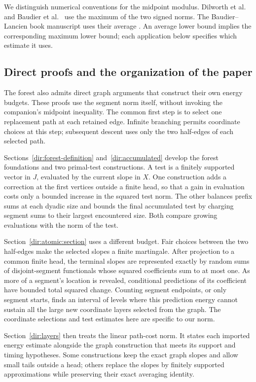 We distinguish numerical conventions for the midpoint modulus.
Dilworth et al.\ \cite[Definition~2.2]{DKRRZ2016} and
Baudier et al.\ \cite[Section~4]{BaudierEtAl2017} use the maximum of the
two signed norms. The Baudier--Lancien book manuscript uses their
average \cite[Definition~5.1.15 of arXiv v1]{BaudierLancien2025}.
An average lower bound implies the corresponding maximum lower bound;
each application below specifies which estimate it uses.

\subsection{Direct proofs and the organization of the paper}
The forest also admits direct graph arguments that construct their own
energy budgets. These proofs use the segment norm itself, without invoking
the companion's midpoint inequality. The common first step is to select
one replacement path at each retained edge. Infinite branching permits
coordinate choices at this step; subsequent descent uses only the two
half-edges of each selected path.

Sections~\ref{dir:forest-definition} and~\ref{dir:accumulated} develop
the forest foundations and two primal-test constructions. A test is a
finitely supported vector in $J$, evaluated by the current slope in $X$.
One construction adds a correction at the first vertices outside a finite
head, so that a gain in evaluation costs only a bounded increase in the
squared test norm. The other balances prefix sums at each dyadic size and
bounds the final accumulated test by charging segment sums to their
largest encountered size. Both compare growing evaluations with the
norm of the test.

Section~\ref{dir:atomic:section} uses a different budget. Fair choices
between the two half-edges make the selected slopes a finite martingale.
After projection to a common finite head, the terminal slopes are
represented exactly by random sums of disjoint-segment functionals whose
squared coefficients sum to at most one. As more of a
segment's location is revealed, conditional predictions of its coefficient
have bounded total squared change. Counting segment endpoints, or only
segment starts, finds an interval of levels where this prediction energy
cannot sustain all the large new coordinate layers selected from the graph.
The coordinate selections and test estimates here are specific to our norm.

Section~\ref{dir:layers} then treats the linear path-cost norm. It
states each imported energy estimate alongside the graph construction
that meets its support and timing hypotheses. Some constructions keep the
exact graph slopes and allow small tails outside a head; others replace
the slopes by finitely supported approximations while preserving their
exact averaging identity.

